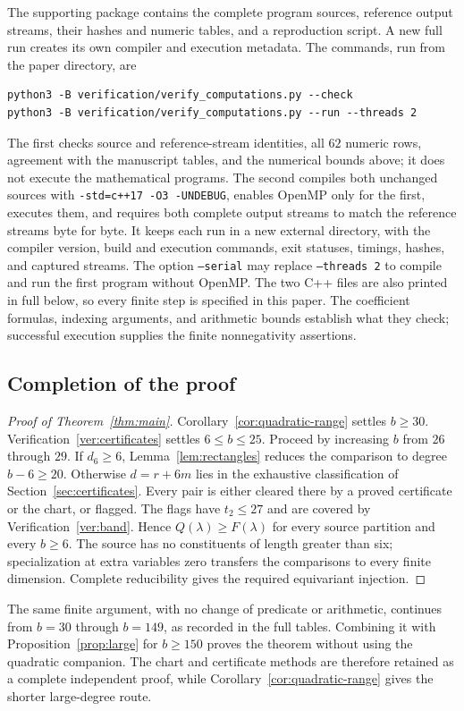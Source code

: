 The supporting package contains the complete program sources, reference
output streams, their hashes and numeric tables, and a reproduction
script. A new full run creates its own compiler and execution metadata.
The commands, run from the paper directory, are
\begin{verbatim}
python3 -B verification/verify_computations.py --check
python3 -B verification/verify_computations.py --run --threads 2
\end{verbatim}
The first checks source and reference-stream identities, all \(62\)
numeric rows, agreement with the manuscript tables, and the numerical
bounds above; it does not execute the mathematical programs.
The second compiles both unchanged sources with
\texttt{-std=c++17 -O3 -UNDEBUG}, enables OpenMP only for the first,
executes them, and requires both complete output streams to match
the reference streams byte for byte. It keeps each run in a new external
directory, with the compiler version, build and execution commands,
exit statuses, timings, hashes, and captured streams. The option
\texttt{--serial} may replace \texttt{--threads 2} to compile and run
the first program without OpenMP.
The two C++ files are also printed in full below, so every finite step
is specified in this paper. The coefficient formulas, indexing
arguments, and arithmetic bounds establish what they check; successful
execution supplies the finite nonnegativity assertions.

\subsection{Completion of the proof}
\begin{proof}[Proof of Theorem~\ref{thm:main}]
Corollary~\ref{cor:quadratic-range} settles \(b\ge30\).
Verification~\ref{ver:certificates} settles \(6\le b\le25\).
Proceed by increasing \(b\) from \(26\) through \(29\).
If \(d_6\ge6\), Lemma~\ref{lem:rectangles} reduces the comparison to
degree \(b-6\ge20\). Otherwise \(d=r+6m\) lies in the exhaustive
classification of Section~\ref{sec:certificates}. Every pair is either
cleared there by a proved certificate or the chart, or flagged.
The flags have \(t_2\le27\) and are covered by
Verification~\ref{ver:band}. Hence \(Q(\lambda)\ge F(\lambda)\) for
every source partition and every \(b\ge6\).
The source has no constituents of length greater than six;
specialization at extra variables zero transfers the comparisons to
every finite dimension. Complete reducibility gives the required
equivariant injection.
\end{proof}

\begin{remark}
The same finite argument, with no change of predicate or arithmetic,
continues from \(b=30\) through \(b=149\), as recorded in the full
tables. Combining it with Proposition~\ref{prop:large} for \(b\ge150\)
proves the theorem without using the quadratic companion.
The chart and certificate methods are therefore retained as a complete
independent proof, while Corollary~\ref{cor:quadratic-range} gives the
shorter large-degree route.
\end{remark}
